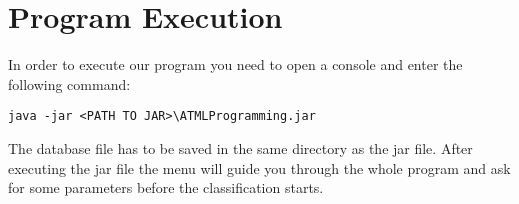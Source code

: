\section{Program Execution}
\label{program_execution}

In order to execute our program you need to open a console and enter the following command:
\begin{center}
	\texttt{java -jar <PATH TO JAR>\textbackslash ATMLProgramming.jar}
\end{center}
The database file has to be saved in the same directory as the jar file.
After executing the jar file the menu will guide you through the whole program and ask for some parameters before the classification starts.